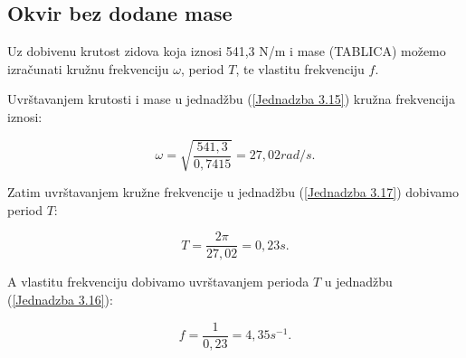 \documentclass[12pt]{book}
\begin{document}
\subsection{Okvir bez dodane mase}

Uz dobivenu krutost zidova koja iznosi 541,3 N/m i mase (TABLICA) možemo izračunati kružnu frekvenciju $\omega$, period $T$, te vlastitu frekvenciju $f$.

Uvrštavanjem krutosti i mase u jednadžbu (\ref{Jednadzba 3.15}) kružna frekvencija iznosi:

\begin{equation}
	\omega = \sqrt{\frac{541,3}{0,7415}} = 27,02 rad/s.
\end{equation}

Zatim uvrštavanjem kružne frekvencije u jednadžbu (\ref{Jednadzba 3.17}) dobivamo period $T$:

\begin{equation}
	T = \frac{2\pi}{27,02} = 0,23 s.
\end{equation}

A vlastitu frekvenciju dobivamo uvrštavanjem perioda $T$ u jednadžbu (\ref{Jednadzba 3.16}):

\begin{equation}
	f = \frac{1}{0,23} = 4,35 s^{-1}.
\end{equation}

\cite{chopra2007}





\cleardoublepage{}

\vspace{\baselineskip}
\renewcommand{\bibname}{\uppercase{Literatura}}




\end{document}
